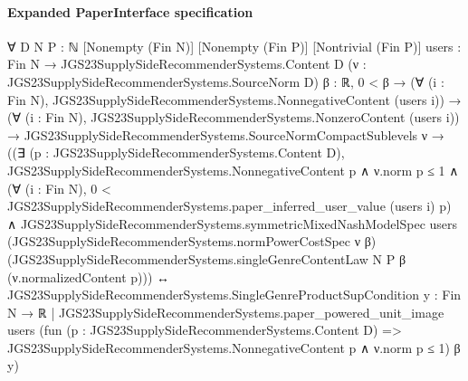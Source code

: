 \documentclass[10pt]{article}
\begin{document}
\paragraph{Expanded PaperInterface specification}
\begin{ReviewVerbatim}
∀ {D N P : ℕ} [Nonempty (Fin N)] [Nonempty (Fin P)] [Nontrivial (Fin P)]
  {users : Fin N → JGS23SupplySideRecommenderSystems.Content D} (ν : JGS23SupplySideRecommenderSystems.SourceNorm D)
  {β : ℝ},
  0 < β →
    (∀ (i : Fin N), JGS23SupplySideRecommenderSystems.NonnegativeContent (users i)) →
      (∀ (i : Fin N), JGS23SupplySideRecommenderSystems.NonzeroContent (users i)) →
        JGS23SupplySideRecommenderSystems.SourceNormCompactSublevels ν →
          ((∃ (p : JGS23SupplySideRecommenderSystems.Content D),
              JGS23SupplySideRecommenderSystems.NonnegativeContent p ∧
                ν.norm p ≤ 1 ∧
                  (∀ (i : Fin N), 0 < JGS23SupplySideRecommenderSystems.paper_inferred_user_value (users i) p) ∧
                    JGS23SupplySideRecommenderSystems.symmetricMixedNashModelSpec users
                      (JGS23SupplySideRecommenderSystems.normPowerCostSpec ν β)
                      (JGS23SupplySideRecommenderSystems.singleGenreContentLaw N P β (ν.normalizedContent p))) ↔
            JGS23SupplySideRecommenderSystems.SingleGenreProductSupCondition
              {y : Fin N → ℝ |
                JGS23SupplySideRecommenderSystems.paper_powered_unit_image users
                  (fun (p : JGS23SupplySideRecommenderSystems.Content D) =>
                    JGS23SupplySideRecommenderSystems.NonnegativeContent p ∧ ν.norm p ≤ 1)
                  β y})
\end{ReviewVerbatim}
\end{document}
